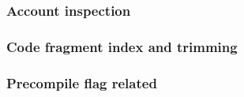 \subsubsection{Account inspection \lispTodo{}}                       \label{hub: account: specialized constraints: inspection}                   
\subsubsection{Code fragment index and trimming \lispDone{}}         \label{hub: account: specialized constraints: CFI and trim}                 
\subsubsection{Precompile flag related \lispDone{}}                  \label{hub: account: specialized constraints: precompile flag related}      
